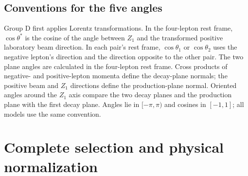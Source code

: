 \documentclass[11pt,a4paper]{article}
\begin{document}
\subsection{Conventions for the five angles}
Group D first applies Lorentz transformations.
In the four-lepton rest frame, $\cos\theta^*$ is the cosine of the angle between $Z_1$ and the transformed positive laboratory beam direction.
In each pair's rest frame, $\cos\theta_1$ or $\cos\theta_2$ uses the negative lepton's direction and the direction opposite to the other pair.
The two plane angles are calculated in the four-lepton rest frame.
Cross products of negative- and positive-lepton momenta define the decay-plane normals; the positive beam and $Z_1$ directions define the production-plane normal.
Oriented angles around the $Z_1$ axis compare the two decay planes and the production plane with the first decay plane.
Angles lie in $[-\pi,\pi)$ and cosines in $[-1,1]$; all models use the same convention.
\FloatBarrier

\section{Complete selection and physical normalization}\label{app:cuts}
\end{document}
